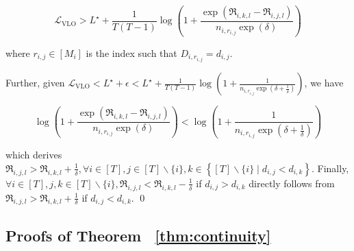 \begin{equation}\label{eq:A31}
    \mathcal{L}_{\mathrm{VLO}}>L^{\star}+\frac{1}{T(T-1)} \log \left(1+\frac{\exp \left(\mathfrak{R}_{i, k,l}-\mathfrak{R}_{i, j,l}\right)}{n_{i, r_{i, j}} \exp (\delta)}\right)
\end{equation}

where $r_{i, j} \in\left[M_i\right]$ is the index such that $D_{i, r_{i, j}}=d_{i, j}$.

Further, given $\mathcal{L}_{\mathrm{VLO}}<L^{\star}+\epsilon<L^{\star}+\frac{1}{T(T-1)} \log \left(1+\frac{1}{n_{i, r_{i, j}} \exp \left(\delta+\frac{1}{\delta}\right)}\right)$, we have

\begin{equation}\label{eq:A32}
    \log \left(1+\frac{\exp \left(\mathfrak{R}_{i, k,l}-\mathfrak{R}_{i, j,l}\right)}{n_{i, r_{i, j}} \exp (\delta)}\right)<\log \left(1+\frac{1}{n_{i, r_{i, j}} \exp \left(\delta+\frac{1}{\delta}\right)}\right)
\end{equation}

which derives $\mathfrak{R}_{i, j,l}>\mathfrak{R}_{i, k,l}+\frac{1}{\delta}, \forall i \in[T], j \in[T] \backslash\{i\}, k \in\left\{[T] \backslash\{i\} \mid d_{i, j}<d_{i, k}\right\}$.
Finally, $\forall i \in[T], j, k \in[T] \backslash\{i\}, \mathfrak{R}_{i, j,l}<\mathfrak{R}_{i, k,l}-\frac{1}{\delta}$ if $d_{i, j}>d_{i, k}$ directly follows from $\mathfrak{R}_{i, j,l}> \mathfrak{R}_{i, k,l}+\frac{1}{\delta}$ if $d_{i, j}<d_{i, k}$.
\qed
\subsection{Proofs of Theorem ~\ref{thm:continuity}}
\label{sec:proof_continuity}
